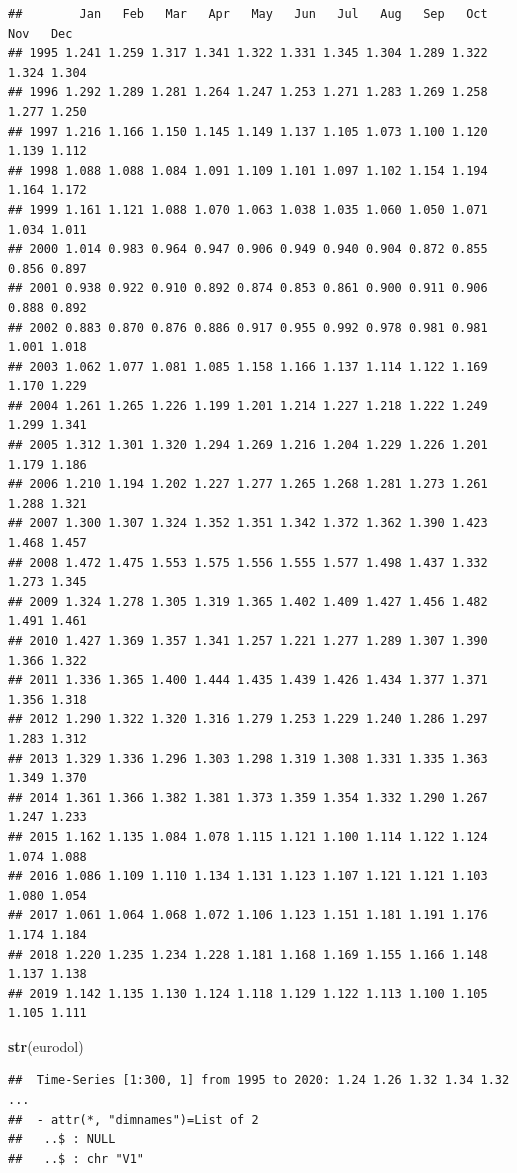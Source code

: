 \documentclass[
]{article}
\newenvironment{Shaded}{\begin{snugshade}}{\end{snugshade}}
\newcommand{\FunctionTok}[1]{\textcolor[rgb]{0.13,0.29,0.53}{\textbf{#1}}}
\newcommand{\NormalTok}[1]{#1}
\begin{document}
\begin{verbatim}
##        Jan   Feb   Mar   Apr   May   Jun   Jul   Aug   Sep   Oct   Nov   Dec
## 1995 1.241 1.259 1.317 1.341 1.322 1.331 1.345 1.304 1.289 1.322 1.324 1.304
## 1996 1.292 1.289 1.281 1.264 1.247 1.253 1.271 1.283 1.269 1.258 1.277 1.250
## 1997 1.216 1.166 1.150 1.145 1.149 1.137 1.105 1.073 1.100 1.120 1.139 1.112
## 1998 1.088 1.088 1.084 1.091 1.109 1.101 1.097 1.102 1.154 1.194 1.164 1.172
## 1999 1.161 1.121 1.088 1.070 1.063 1.038 1.035 1.060 1.050 1.071 1.034 1.011
## 2000 1.014 0.983 0.964 0.947 0.906 0.949 0.940 0.904 0.872 0.855 0.856 0.897
## 2001 0.938 0.922 0.910 0.892 0.874 0.853 0.861 0.900 0.911 0.906 0.888 0.892
## 2002 0.883 0.870 0.876 0.886 0.917 0.955 0.992 0.978 0.981 0.981 1.001 1.018
## 2003 1.062 1.077 1.081 1.085 1.158 1.166 1.137 1.114 1.122 1.169 1.170 1.229
## 2004 1.261 1.265 1.226 1.199 1.201 1.214 1.227 1.218 1.222 1.249 1.299 1.341
## 2005 1.312 1.301 1.320 1.294 1.269 1.216 1.204 1.229 1.226 1.201 1.179 1.186
## 2006 1.210 1.194 1.202 1.227 1.277 1.265 1.268 1.281 1.273 1.261 1.288 1.321
## 2007 1.300 1.307 1.324 1.352 1.351 1.342 1.372 1.362 1.390 1.423 1.468 1.457
## 2008 1.472 1.475 1.553 1.575 1.556 1.555 1.577 1.498 1.437 1.332 1.273 1.345
## 2009 1.324 1.278 1.305 1.319 1.365 1.402 1.409 1.427 1.456 1.482 1.491 1.461
## 2010 1.427 1.369 1.357 1.341 1.257 1.221 1.277 1.289 1.307 1.390 1.366 1.322
## 2011 1.336 1.365 1.400 1.444 1.435 1.439 1.426 1.434 1.377 1.371 1.356 1.318
## 2012 1.290 1.322 1.320 1.316 1.279 1.253 1.229 1.240 1.286 1.297 1.283 1.312
## 2013 1.329 1.336 1.296 1.303 1.298 1.319 1.308 1.331 1.335 1.363 1.349 1.370
## 2014 1.361 1.366 1.382 1.381 1.373 1.359 1.354 1.332 1.290 1.267 1.247 1.233
## 2015 1.162 1.135 1.084 1.078 1.115 1.121 1.100 1.114 1.122 1.124 1.074 1.088
## 2016 1.086 1.109 1.110 1.134 1.131 1.123 1.107 1.121 1.121 1.103 1.080 1.054
## 2017 1.061 1.064 1.068 1.072 1.106 1.123 1.151 1.181 1.191 1.176 1.174 1.184
## 2018 1.220 1.235 1.234 1.228 1.181 1.168 1.169 1.155 1.166 1.148 1.137 1.138
## 2019 1.142 1.135 1.130 1.124 1.118 1.129 1.122 1.113 1.100 1.105 1.105 1.111
\end{verbatim}

\begin{Shaded}
\begin{Highlighting}[]
\FunctionTok{str}\NormalTok{(eurodol)}
\end{Highlighting}
\end{Shaded}

\begin{verbatim}
##  Time-Series [1:300, 1] from 1995 to 2020: 1.24 1.26 1.32 1.34 1.32 ...
##  - attr(*, "dimnames")=List of 2
##   ..$ : NULL
##   ..$ : chr "V1"
\end{verbatim}
\end{document}
